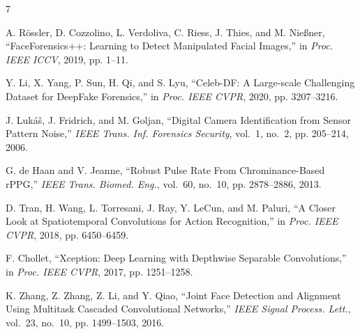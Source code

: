 \documentclass[10pt,twocolumn]{IEEEtran}
\begin{document}
\balance
\begin{thebibliography}{7}

A. Rössler, D. Cozzolino, L. Verdoliva, C. Riess, J. Thies, and M. Nießner,
``FaceForensics++: Learning to Detect Manipulated Facial Images,''
in \textit{Proc. IEEE ICCV}, 2019, pp. 1--11.

Y. Li, X. Yang, P. Sun, H. Qi, and S. Lyu,
``Celeb-DF: A Large-scale Challenging Dataset for DeepFake Forensics,''
in \textit{Proc. IEEE CVPR}, 2020, pp. 3207--3216.

J. Luk\'a\v{s}, J. Fridrich, and M. Goljan,
``Digital Camera Identification from Sensor Pattern Noise,''
\textit{IEEE Trans. Inf. Forensics Security}, vol.~1, no.~2, pp. 205--214, 2006.

G. de Haan and V. Jeanne,
``Robust Pulse Rate From Chrominance-Based rPPG,''
\textit{IEEE Trans. Biomed. Eng.}, vol.~60, no.~10, pp. 2878--2886, 2013.

D. Tran, H. Wang, L. Torresani, J. Ray, Y. LeCun, and M. Paluri,
``A Closer Look at Spatiotemporal Convolutions for Action Recognition,''
in \textit{Proc. IEEE CVPR}, 2018, pp. 6450--6459.

F. Chollet,
``Xception: Deep Learning with Depthwise Separable Convolutions,''
in \textit{Proc. IEEE CVPR}, 2017, pp. 1251--1258.

K. Zhang, Z. Zhang, Z. Li, and Y. Qiao,
``Joint Face Detection and Alignment Using Multitask Cascaded Convolutional Networks,''
\textit{IEEE Signal Process. Lett.}, vol.~23, no.~10, pp. 1499--1503, 2016.

\end{thebibliography}
\end{document}
